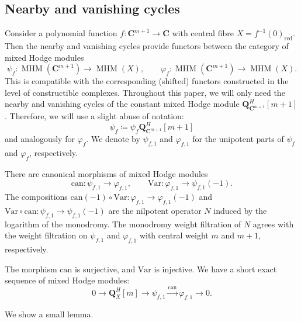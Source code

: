 \documentclass[letterpaper,11pt]{amsart}
\theoremstyle{plain}
\theoremstyle{definition}
\theoremstyle{remark}
\newcommand{\QQ}{\mathbf{Q}}
\newcommand{\CC}{\mathbf{C}}
\DeclareMathOperator{\MHM}{MHM}
\begin{document}
    \subsection{Nearby and vanishing cycles}
    Consider a polynomial function $f \colon \CC^{m+1} \to \CC$ with central fibre $X = f^{-1}(0)_{\mathrm{red}}$. Then the nearby and vanishing cycles provide functors between the category of mixed Hodge modules
    $$ \psi_{f} \colon \MHM(\CC^{m+1}) \to \MHM(X), \qquad \varphi_{f} \colon \MHM(\CC^{m+1}) \to \MHM(X).$$
    This is compatible with the corresponding (shifted) functors constructed in the level of constructible complexes. Throughout this paper, we will only need the nearby and vanishing cycles of the constant mixed Hodge module $\QQ_{\CC^{m+1}}^{H}[m+1]$. Therefore, we will use a slight abuse of notation:
    $$ \psi_{f} \coloneqq \psi_{f} \QQ_{\CC^{m+1}}^{H}[m+1]$$
    and analogously for $\varphi_{f}$. We denote by $\psi_{f,1}$ and $\varphi_{f,1}$ for the unipotent parts of $\psi_{f}$ and $\varphi_{f}$, respectively.

    There are canonical morphisms of mixed Hodge modules
    $$ \mathrm{can} \colon \psi_{f, 1} \to \varphi_{f, 1}, \qquad \mathrm{Var} \colon \varphi_{f, 1} \to \psi_{f,1}(-1). $$
    The compositions $\mathrm{can}(-1) \circ \mathrm{Var} \colon \varphi_{f, 1} \to \varphi_{f,1}(-1)$ and $\mathrm{Var}\circ \mathrm{can} \colon \psi_{f, 1} \to \psi_{f, 1}(-1)$ are the nilpotent operator $N$ induced by the logarithm of the monodromy. The monodromy weight filtration of $N$ agrees with the weight filtration on $\psi_{f,1}$ and $\varphi_{f,1}$ with central weight $m$ and $m+1$, respectively.
    
    The morphism $\mathrm{can}$ is surjective, and $\mathrm{Var}$ is injective. We have a short exact sequence of mixed Hodge modules:
    $$ 0 \to \QQ_{X}^{H}[m] \to \psi_{f,1} \xrightarrow{\mathrm{can}} \varphi_{f,1} \to 0.$$

    We show a small lemma.
\end{document}
